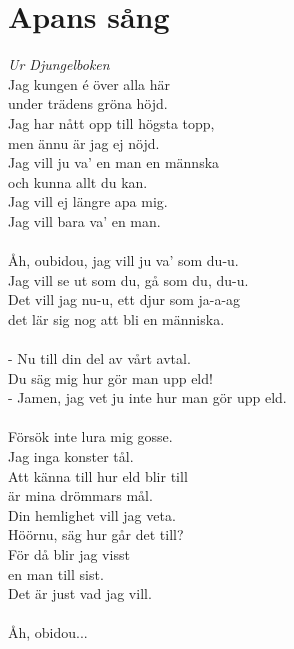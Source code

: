 \section{Apans sång}
\textit{Ur Djungelboken}
\vspace{2mm}\\
Jag kungen é över alla här\\
under trädens gröna höjd.\\
Jag har nått opp till högsta topp,\\
men ännu är jag ej nöjd.\\
Jag vill ju va' en man en männska\\
och kunna allt du kan.\\
Jag vill ej längre apa mig.\\
Jag vill bara va' en man.\\
\\
Åh, oubidou, jag vill ju va' som du-u.\\
Jag vill se ut som du, gå som du, du-u.\\
Det vill jag nu-u, ett djur som ja-a-ag\\
det lär sig nog att bli en människa.\\
\\
- Nu till din del av vårt avtal.\\
Du säg mig hur gör man upp eld!\\
- Jamen, jag vet ju inte hur man gör upp eld.\\
\\
Försök inte lura mig gosse.\\
Jag inga konster tål.\\
Att känna till hur eld blir till\\
är mina drömmars mål.\\
Din hemlighet vill jag veta.\\
Höörnu, säg hur går det till?\\
För då blir jag visst\\
en man till sist.\\
Det är just vad jag vill.\\
\\
Åh, obidou...\\

